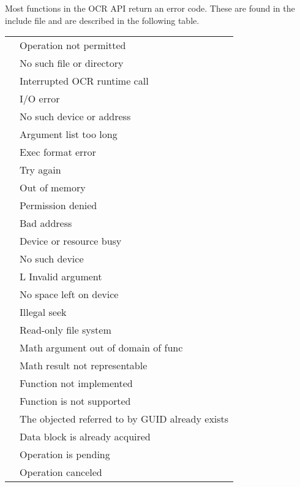 Most functions in the OCR API return an error code.  These are found
in the  include file and are described in the following table.

\tablelasttail{\hline}
\begin{supertabular}{p{1.25in} p{2.75in}}
\label{tab:errorcodes}
 & Operation not permitted\\
 & No such file or directory\\
 & Interrupted OCR runtime call\\
 & I/O error\\
 & No such device or address\\
 & Argument list too long\\
 & Exec format error\\
 & Try again\\
 & Out of memory\\
 & Permission denied\\
 & Bad address\\
 & Device or resource busy\\
 & No such device\\
 &L Invalid argument\\
 & No space left on device\\
 & Illegal seek\\
 & Read-only file system\\
 & Math argument out of domain of func\\
 & Math result not representable\\
 & Function not implemented\\
 & Function is not supported\\
 & The objected referred to by GUID already exists\\
 & Data block is already acquired\\
 & Operation is pending\\
 & Operation canceled\\
\end{supertabular}

